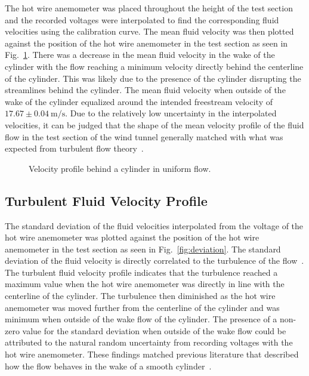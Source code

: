 \documentclass[journal,letterpaper]{IEEEtran}
\begin{document}
The hot wire anemometer was placed throughout the height of the test section and the recorded voltages were interpolated to find the corresponding fluid velocities using the calibration curve.
The mean fluid velocity was then plotted against the position of the hot wire anemometer in the test section as seen in Fig.~\ref{fig:profile}.
There was a decrease in the mean fluid velocity in the wake of the cylinder with the flow reaching a minimum velocity directly behind the centerline of the cylinder.
This was likely due to the presence of the cylinder disrupting the streamlines behind the cylinder.
The mean fluid velocity when outside of the wake of the cylinder equalized around the intended freestream velocity of $17.67 \pm \qty{0.04}{\m\per\s}$.
Due to the relatively low uncertainty in the interpolated velocities, it can be judged that the shape of the mean velocity profile of the fluid flow in the test section of the wind tunnel generally matched with what was expected from turbulent flow theory~\cite{lab3doc}.

\begin{figure}[H]
    \centering
    
    \caption{Velocity profile behind a cylinder in uniform flow.}
    \label{fig:profile}
\end{figure}

\subsection{Turbulent Fluid Velocity Profile}

The standard deviation of the fluid velocities interpolated from the voltage of the hot wire anemometer was plotted against the position of the hot wire anemometer in the test section as seen in Fig.~\ref{fig:deviation}.
The standard deviation of the fluid velocity is directly correlated to the turbulence of the flow~\cite{turbulence}.
The turbulent fluid velocity profile indicates that the turbulence reached a maximum value when the hot wire anemometer was directly in line with the centerline of the cylinder.
The turbulence then diminished as the hot wire anemometer was moved further from the centerline of the cylinder and was minimum when outside of the wake flow of the cylinder.
The presence of a non-zero value for the standard deviation when outside of the wake flow could be attributed to the natural random uncertainty from recording voltages with the hot wire anemometer.
These findings matched previous literature that described how the flow behaves in the wake of a smooth cylinder~\cite{turbulence}.
\end{document}

